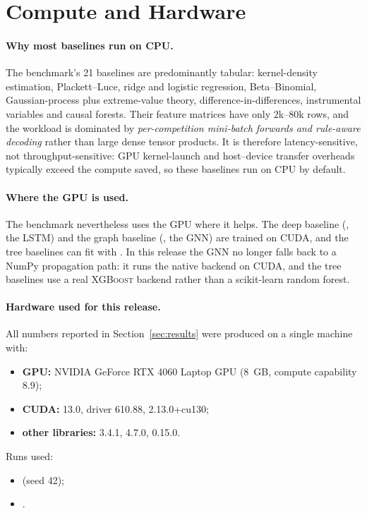 \section{Compute and Hardware}
\label{sec:compute}

\paragraph{Why most baselines run on CPU.}
The benchmark's 21 baselines are predominantly tabular: kernel-density
estimation, Plackett--Luce, ridge and logistic regression, Beta--Binomial,
Gaussian-process plus extreme-value theory, difference-in-differences,
instrumental variables and causal forests. Their feature matrices have only
$2$k--$80$k rows, and the workload is dominated by \emph{per-competition
mini-batch forwards and rule-aware decoding} rather than large dense tensor
products. It is therefore latency-sensitive, not throughput-sensitive: GPU
kernel-launch and host--device transfer overheads typically exceed the compute
saved, so these baselines run on CPU by default.

\paragraph{Where the GPU is used.}
The benchmark nevertheless uses the GPU where it helps. The deep baseline
(, the LSTM) and the graph baseline
(, the GNN) are trained on CUDA, and the tree baselines
can fit with . In this release the GNN no longer falls back
to a NumPy propagation path: it runs the native  backend on CUDA, and
the tree baselines use a real \textsc{XGBoost} backend rather than a
scikit-learn random forest.

\paragraph{Hardware used for this release.}
All numbers reported in Section~\ref{sec:results} were produced on a single
machine with:
\begin{itemize}
  \item \textbf{GPU:} NVIDIA GeForce RTX 4060 Laptop GPU (8~GB,
        compute capability 8.9);
  \item \textbf{CUDA:} 13.0, driver 610.88,  2.13.0+cu130;
  \item \textbf{other libraries:}  3.4.1,  4.7.0,
         0.15.0.
\end{itemize}
Runs used:
\begin{itemize}
  \item {} (seed 42);
  \item {}.
\end{itemize}

